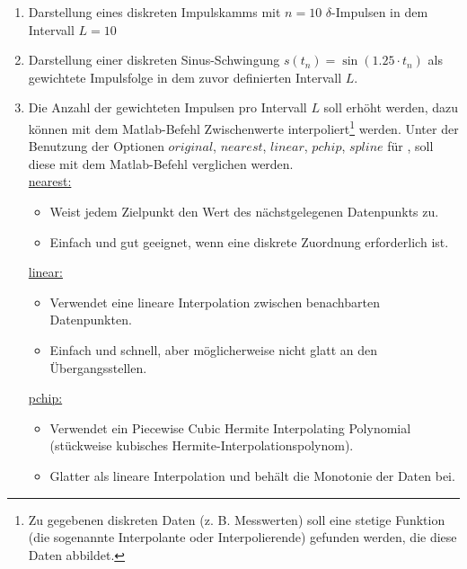 \begin{enumerate}[label=\alph*)]
	\item Darstellung eines diskreten Impulskamms mit $n=10$ $\delta$-Impulsen in dem Intervall $L=10$ \vspace{4pt}\\
	
	\item Darstellung einer diskreten Sinus-Schwingung $s(t_n) = \sin(\num{1,25} \cdot{t_n})$ als gewichtete Impulsfolge in dem zuvor definierten Intervall $L$. \vspace{4pt}\\
	
	\item Die Anzahl der gewichteten Impulsen pro Intervall $L$ soll erhöht werden, dazu können mit dem Matlab-Befehl  Zwischenwerte interpoliert\footnote{Zu gegebenen diskreten Daten (z. B. Messwerten) soll eine stetige Funktion (die sogenannte Interpolante oder Interpolierende) gefunden werden, die diese Daten abbildet.} werden. Unter der Benutzung der Optionen $original$, $nearest$, $linear$, $pchip$, $spline$ für , soll diese mit dem Matlab-Befehl  verglichen werden. \\
	
	\underline{nearest:} \vspace{-12pt}\\
	\begin{itemize}
		\item Weist jedem Zielpunkt den Wert des nächstgelegenen Datenpunkts zu.
		\item Einfach und gut geeignet, wenn eine diskrete Zuordnung erforderlich ist. \\
	\end{itemize}
	
	\underline{linear:} \vspace{-12pt}\\
	\begin{itemize}
		\item Verwendet eine lineare Interpolation zwischen benachbarten Datenpunkten.
		\item Einfach und schnell, aber möglicherweise nicht glatt an den Übergangsstellen. \\
	\end{itemize}
	
	\underline{pchip:} \vspace{-12pt}\\
	\begin{itemize}
		\item Verwendet ein Piecewise Cubic Hermite Interpolating Polynomial (stückweise kubisches Hermite-Interpolationspolynom).
		\item Glatter als lineare Interpolation und behält die Monotonie der Daten bei. \\
	\end{itemize}
	

\end{enumerate}
